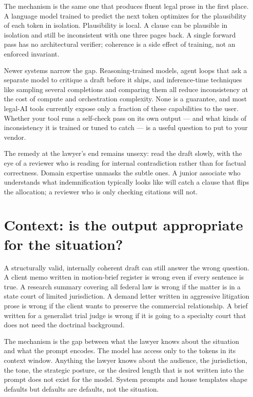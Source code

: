 \documentclass[11pt,a4paper]{article}
\begin{document}
The mechanism is the same one that produces fluent legal prose in
the first place. A language model trained to predict the next
token optimizes for the plausibility of each token in isolation.
Plausibility is local. A clause can be plausible in isolation and
still be inconsistent with one three pages back. A single forward
pass has no architectural verifier; coherence is a side effect of
training, not an enforced invariant.

Newer systems narrow the gap. Reasoning-trained models, agent
loops that ask a separate model to critique a draft before it
ships, and inference-time techniques like sampling several
completions and comparing them all reduce inconsistency at the
cost of compute and orchestration complexity. None is a guarantee,
and most legal-AI tools currently expose only a fraction of these
capabilities to the user. Whether your tool runs a self-check pass
on its own output --- and what kinds of inconsistency it is
trained or tuned to catch --- is a useful question to put to your
vendor.

The remedy at the lawyer's end remains unsexy: read the draft
slowly, with the eye of a reviewer who is reading for internal
contradiction rather than for factual correctness. Domain
expertise unmasks the subtle ones. A junior associate who
understands what indemnification typically looks like will catch a
clause that flips the allocation; a reviewer who is only checking
citations will not.

\section*{Context: is the output appropriate for the situation?}

A structurally valid, internally coherent draft can still answer
the wrong question. A client memo written in motion-brief register
is wrong even if every sentence is true. A research summary
covering all federal law is wrong if the matter is in a state
court of limited jurisdiction. A demand letter written in
aggressive litigation prose is wrong if the client wants to
preserve the commercial relationship. A brief written for a
generalist trial judge is wrong if it is going to a specialty
court that does not need the doctrinal background.

The mechanism is the gap between what the lawyer knows about the
situation and what the prompt encodes. The model has access only
to the tokens in its context window. Anything the lawyer knows
about the audience, the jurisdiction, the tone, the strategic
posture, or the desired length that is not written into the prompt
does not exist for the model. System prompts and house templates
shape defaults but defaults are defaults, not the situation.
\end{document}
